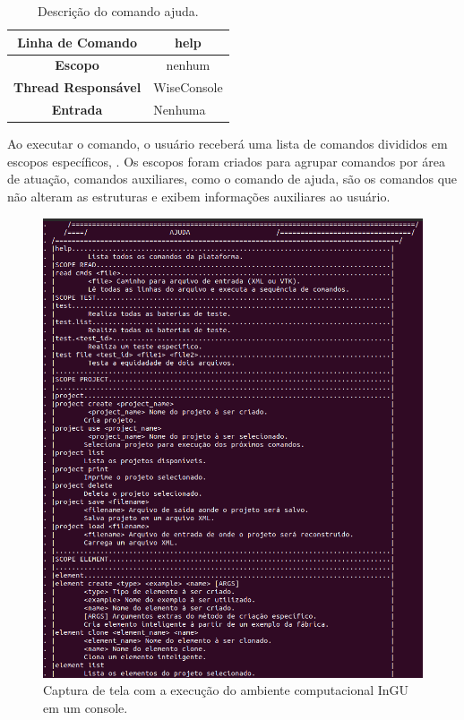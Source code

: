 \begin{center}
	\begin{table}[!htbp]
		\begin{tabularx}{\textwidth}{c|X}
			\toprule
			\textbf{Linha de Comando} & \multicolumn{1}{c}{help} \\
			\midrule
			\textbf{Escopo} & \multicolumn{1}{c}{nenhum} \\
			\hline
			\textbf{Thread Responsável} & \multicolumn{1}{c}{WiseConsole} \\
			\hline
			\textbf{Entrada} & Nenhuma \\
			\bottomrule
		\end{tabularx}
		\caption{Descrição do comando ajuda.}
		\label{tab:help}
	\end{table}
\end{center}

Ao executar o comando, o usuário receberá uma lista de comandos divididos em escopos específicos, . Os escopos foram criados para agrupar comandos por área de atuação, comandos auxiliares, como o comando de ajuda, são os comandos que não alteram as estruturas e exibem informações auxiliares ao usuário.


\begin{figure}[!htbp]
	\centering
	\includegraphics[scale=0.45]{Figures/InGU_help.png}
	\caption{Captura de tela com a execução do ambiente computacional InGU em um console.}
	\label{fig10:ajuda}
\end{figure}


